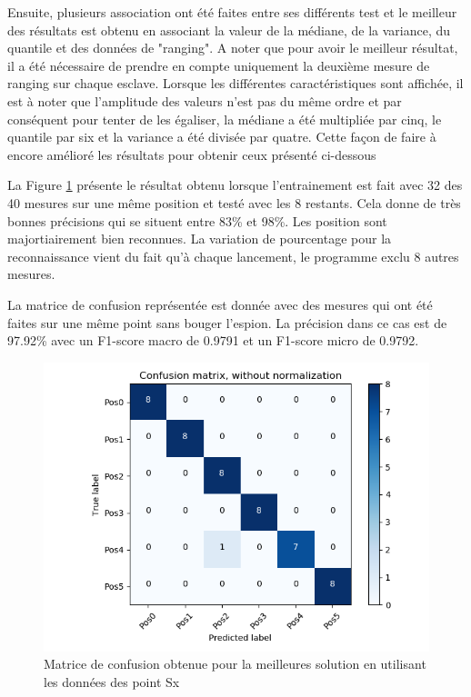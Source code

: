 Ensuite, plusieurs association ont été faites entre ses différents test et le meilleur des résultats est obtenu en associant la valeur de la médiane, de la variance, du quantile et des données de "ranging". A noter que pour avoir le meilleur résultat, il a été nécessaire de prendre en compte uniquement la deuxième mesure de ranging sur chaque esclave. Lorsque les différentes caractéristiques sont affichée, il est à noter que l'amplitude des valeurs n'est pas du même ordre et par conséquent pour tenter de les égaliser, la médiane a été multipliée par cinq, le quantile par six et la variance a été divisée par quatre. Cette façon de faire à encore amélioré les résultats pour obtenir ceux présenté ci-dessous

La Figure \ref{fig:matPosSx} présente le résultat obtenu lorsque l'entrainement est fait avec 32 des 40 mesures sur une même position et testé avec les 8 restants. Cela donne de très bonnes précisions qui se situent entre 83\% et 98\%. Les position sont majortiairement bien reconnues. La variation de pourcentage pour la reconnaissance vient du fait qu'à chaque lancement, le programme exclu 8 autres mesures.

La matrice de confusion représentée est donnée avec des mesures qui ont été faites sur une même point sans bouger l'espion. La précision dans ce cas est de 97.92\% avec un F1-score macro de 0.9791 et un F1-score micro de 0.9792. 

\begin{figure}[htp]
	\begin{center}
		\includegraphics[scale=0.5]{figures/mat_pos_Sx.PNG}
		\caption{Matrice de confusion obtenue pour la meilleures solution en utilisant les données des point Sx}
		\label{fig:matPosSx} %
	\end{center}
\end{figure}

